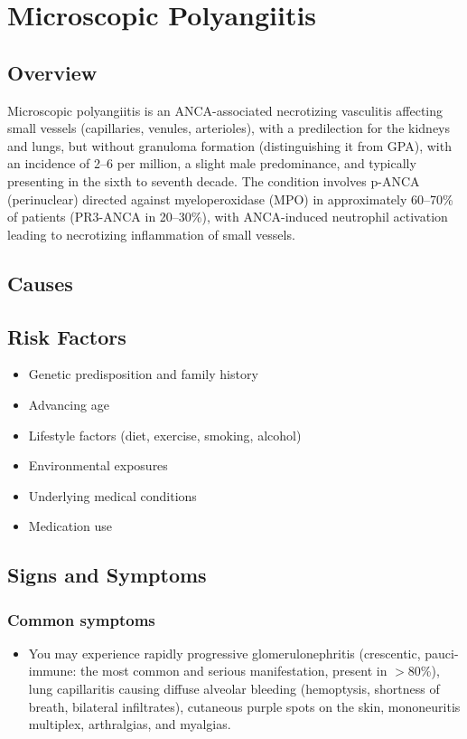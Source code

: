 \chapter{Microscopic Polyangiitis}
\label{sec:Microscopic Polyangiitis (MPA)}

\section{Overview}
Microscopic polyangiitis is an ANCA-associated necrotizing vasculitis affecting small vessels (capillaries, venules, arterioles), with a predilection for the kidneys and lungs, but without granuloma formation (distinguishing it from GPA), with an incidence of 2--6 per million, a slight male predominance, and typically presenting in the sixth to seventh decade. The condition involves p-ANCA (perinuclear) directed against myeloperoxidase (MPO) in approximately 60--70\% of patients (PR3-ANCA in 20--30\%), with ANCA-induced neutrophil activation leading to necrotizing inflammation of small vessels.
\section{Causes}
\section{Risk Factors}

\begin{itemize}[noitemsep]
  \item Genetic predisposition and family history
  \item Advancing age
  \item Lifestyle factors (diet, exercise, smoking, alcohol)
  \item Environmental exposures
  \item Underlying medical conditions
  \item Medication use
\end{itemize}
\section{Signs and Symptoms}

\subsection{Common symptoms}
\begin{itemize}[noitemsep]
  \item You may experience rapidly progressive glomerulonephritis (crescentic, pauci-immune: the most common and serious manifestation, present in $>$80\%), lung capillaritis causing diffuse alveolar bleeding (hemoptysis, shortness of breath, bilateral infiltrates), cutaneous purple spots on the skin, mononeuritis multiplex, arthralgias, and myalgias. 
  \end{itemize}

